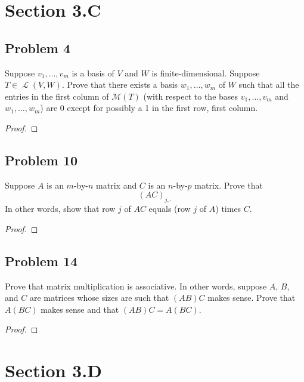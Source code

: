 \documentclass[letterpaper, 12pt]{amsart}
\DeclareMathOperator{\Ell}{\mathscr{L}}
\theoremstyle{definition}  %
\begin{document}
	\section*{Section 3.C}
		\subsection*{Problem 4}
		Suppose $v_{1}, \dots, v_{m}$ is a basis of $V$ and $W$ is finite-dimensional. 
		Suppose $T \in \Ell(V,W)$. 
		Prove that there exists a basis $w_{1}, \dots, w_{m}$ of $W$ such that all the entries in the first column of $\mathcal{M}(T)$ (with respect to the bases $v_{1}, \dots, v_{m}$ and $w_{1}, \dots, w_{m}$) are 0 except for possibly a 1 in the first row, first column.

		\begin{proof}
		\end{proof}

		\subsection*{Problem 10}
		Suppose $A$ is an $m$-by-$n$ matrix and $C$ is an $n$-by-$p$ matrix. 
		Prove that $$(AC)_{j,\cdot}$$
		In other words, show that row $j$ of $AC$ equals (row $j$ of $A$) times $C$.

		\begin{proof}
		\end{proof}

		\subsection*{Problem 14}
		Prove that matrix multiplication is associative. 
		In other words, suppose $A$, $B$, and $C$ are matrices whose sizes are such that $(AB)C$ makes sense. Prove that $A(BC)$ makes sense and that $(AB)C = A(BC)$.

		\begin{proof}
		\end{proof}

	\section*{Section 3.D}
\end{document}
